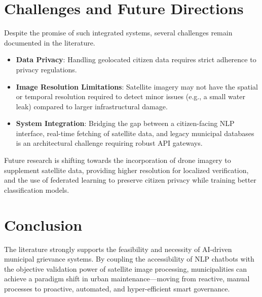 \documentclass[12pt,a4paper]{article}
\begin{document}
\section{Challenges and Future Directions}
Despite the promise of such integrated systems, several challenges remain documented in the literature. 
\begin{itemize}
    \item \textbf{Data Privacy}: Handling geolocated citizen data requires strict adherence to privacy regulations.
    \item \textbf{Image Resolution Limitations}: Satellite imagery may not have the spatial or temporal resolution required to detect minor issues (e.g., a small water leak) compared to larger infrastructural damage.
    \item \textbf{System Integration}: Bridging the gap between a citizen-facing NLP interface, real-time fetching of satellite data, and legacy municipal databases is an architectural challenge requiring robust API gateways.
\end{itemize}

Future research is shifting towards the incorporation of drone imagery to supplement satellite data, providing higher resolution for localized verification, and the use of federated learning to preserve citizen privacy while training better classification models.

\section{Conclusion}
The literature strongly supports the feasibility and necessity of AI-driven municipal grievance systems. By coupling the accessibility of NLP chatbots with the objective validation power of satellite image processing, municipalities can achieve a paradigm shift in urban maintenance—moving from reactive, manual processes to proactive, automated, and hyper-efficient smart governance.
\end{document}
